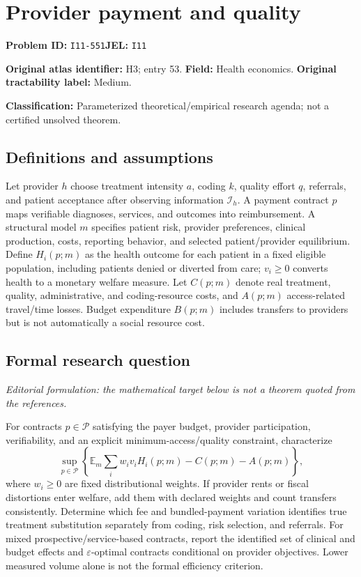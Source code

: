 \documentclass[11pt,a4paper]{article}
\begin{document}
\section*{Provider payment and quality}
\textbf{Problem ID:} \texttt{I11-551}\quad \textbf{JEL:} \texttt{I11}\par
\label{problem:OP-0053}
\label{atlas:prob:H3}
\noindent\textbf{Original atlas identifier:} H3; entry 53. \textbf{Field:} Health economics. \textbf{Original tractability label:} Medium.

\noindent\textbf{Classification:} Parameterized theoretical/empirical research agenda; not a certified unsolved theorem.

\subsection*{Definitions and assumptions}
Let provider $h$ choose treatment intensity $a$, coding $k$, quality effort $q$, referrals, and patient acceptance after observing information $\mathcal I_h$. A payment contract $p$ maps verifiable diagnoses, services, and outcomes into reimbursement. A structural model $m$ specifies patient risk, provider preferences, clinical production, costs, reporting behavior, and selected patient/provider equilibrium. Define $H_i(p;m)$ as the health outcome for each patient in a fixed eligible population, including patients denied or diverted from care; $v_i\geq0$ converts health to a monetary welfare measure. Let $C(p;m)$ denote real treatment, quality, administrative, and coding-resource costs, and $A(p;m)$ access-related travel/time losses. Budget expenditure $B(p;m)$ includes transfers to providers but is not automatically a social resource cost.

\subsection*{Formal research question}
\emph{Editorial formulation: the mathematical target below is not a theorem quoted from the references.}

For contracts $p\in\mathcal P$ satisfying the payer budget, provider participation, verifiability, and an explicit minimum-access/quality constraint, characterize
\[
 \sup_{p\in\mathcal P}\left\{\mathbb E_m\sum_i w_i v_iH_i(p;m)-C(p;m)-A(p;m)\right\},
\]
where $w_i\geq0$ are fixed distributional weights. If provider rents or fiscal distortions enter welfare, add them with declared weights and count transfers consistently. Determine which fee and bundled-payment variation identifies true treatment substitution separately from coding, risk selection, and referrals. For mixed prospective/service-based contracts, report the identified set of clinical and budget effects and $\varepsilon$-optimal contracts conditional on provider objectives. Lower measured volume alone is not the formal efficiency criterion.
\end{document}
